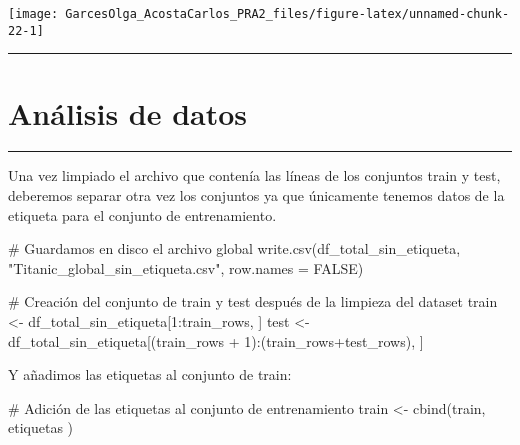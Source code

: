 \documentclass[
]{article}
\newenvironment{Shaded}{\begin{snugshade}}{\end{snugshade}}
\newcommand{\CommentTok}[1]{\textcolor[rgb]{0.50,0.62,0.50}{#1}}
\newcommand{\DataTypeTok}[1]{\textcolor[rgb]{0.87,0.87,0.75}{#1}}
\newcommand{\DecValTok}[1]{\textcolor[rgb]{0.86,0.86,0.80}{#1}}
\newcommand{\KeywordTok}[1]{\textcolor[rgb]{0.94,0.87,0.69}{#1}}
\newcommand{\NormalTok}[1]{\textcolor[rgb]{0.80,0.80,0.80}{#1}}
\newcommand{\OperatorTok}[1]{\textcolor[rgb]{0.94,0.94,0.82}{#1}}
\newcommand{\OtherTok}[1]{\textcolor[rgb]{0.94,0.94,0.56}{#1}}
\newcommand{\StringTok}[1]{\textcolor[rgb]{0.80,0.58,0.58}{#1}}
\begin{document}
\begin{center}\texttt{[image: GarcesOlga\_AcostaCarlos\_PRA2\_files/figure-latex/unnamed-chunk-22-1]} \end{center}

\begin{center}\rule{0.5\linewidth}{0.5pt}\end{center}

\hypertarget{anuxe1lisis-de-datos}{%
\section{\texorpdfstring{\textbf{Análisis de
datos}}{Análisis de datos}}\label{anuxe1lisis-de-datos}}

\begin{center}\rule{0.5\linewidth}{0.5pt}\end{center}

Una vez limpiado el archivo que contenía las líneas de los conjuntos
train y test, deberemos separar otra vez los conjuntos ya que únicamente
tenemos datos de la etiqueta para el conjunto de entrenamiento.

\begin{Shaded}
\begin{Highlighting}[]
\CommentTok{# Guardamos en disco el archivo global}
\KeywordTok{write.csv}\NormalTok{(df_total_sin_etiqueta, }\StringTok{"Titanic_global_sin_etiqueta.csv"}\NormalTok{, }\DataTypeTok{row.names =} \OtherTok{FALSE}\NormalTok{)}
\end{Highlighting}
\end{Shaded}

\begin{Shaded}
\begin{Highlighting}[]
\CommentTok{# Creación del conjunto de train y test después de la limpieza del dataset}
\NormalTok{train <-}\StringTok{ }\NormalTok{df_total_sin_etiqueta[}\DecValTok{1}\OperatorTok{:}\NormalTok{train_rows, ]}
\NormalTok{test <-}\StringTok{ }\NormalTok{df_total_sin_etiqueta[(train_rows }\OperatorTok{+}\StringTok{ }\DecValTok{1}\NormalTok{)}\OperatorTok{:}\NormalTok{(train_rows}\OperatorTok{+}\NormalTok{test_rows), ]}
\end{Highlighting}
\end{Shaded}

Y añadimos las etiquetas al conjunto de train:

\begin{Shaded}
\begin{Highlighting}[]
\CommentTok{# Adición de las etiquetas al conjunto de entrenamiento}
\NormalTok{train <-}\StringTok{ }\KeywordTok{cbind}\NormalTok{(train, etiquetas )}
\end{Highlighting}
\end{Shaded}
\end{document}
